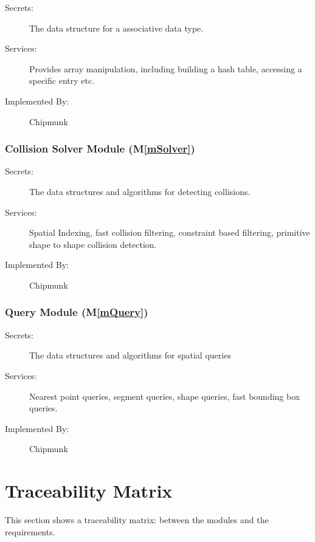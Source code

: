 \documentclass[12pt]{article}
\newcommand{\mref}[1]{M\ref{#1}}
\begin{document}
\begin{description}
\item[Secrets:] The data structure for a associative data type.
\item[Services:] Provides array manipulation, including building a hash table,
  accessing a specific entry etc.
\item[Implemented By:] Chipmunk
\end{description}

\subsubsection{Collision Solver Module (\mref{mSolver})}

\begin{description}
\item[Secrets:] The data structures and algorithms for detecting collisions.
\item[Services:] Spatial Indexing, fast collision filtering, constraint 
based filtering, primitive shape to shape collision detection.
\item[Implemented By:] Chipmunk
\end{description}

\subsubsection{Query Module (\mref{mQuery})}

\begin{description}
\item[Secrets:] The data structures and algorithms for spatial queries
\item[Services:] Nearest point queries, segment queries, shape queries,
fast bounding box queries.
\item[Implemented By:] Chipmunk
\end{description}
\section{Traceability Matrix} \label{SecTM}

This section shows a traceability matrix: between the modules and the
requirements.
\end{document}
